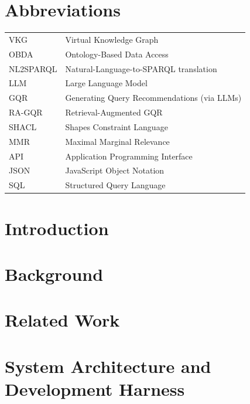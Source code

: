\documentclass[a4paper,11pt]{report}
\begin{document}
\newpage\null\thispagestyle{empty}\newpage

\tableofcontents
\listoffigures
\listoftables

\chapter*{Abbreviations}

\begin{tabular}{ll}
VKG      & Virtual Knowledge Graph \\
OBDA     & Ontology-Based Data Access \\
NL2SPARQL & Natural-Language-to-SPARQL translation \\
LLM      & Large Language Model \\
GQR      & Generating Query Recommendations (via LLMs) \\
RA-GQR   & Retrieval-Augmented GQR \\
SHACL    & Shapes Constraint Language \\
MMR      & Maximal Marginal Relevance \\
API      & Application Programming Interface \\
JSON     & JavaScript Object Notation \\
SQL      & Structured Query Language \\
\end{tabular}

\chapter{Introduction}\label{ch:intro}
    

\chapter{Background}\label{ch:background}
    

\chapter{Related Work}\label{ch:relwork}
    

\chapter{System Architecture and Development Harness}\label{ch:arch}
    
\end{document}
